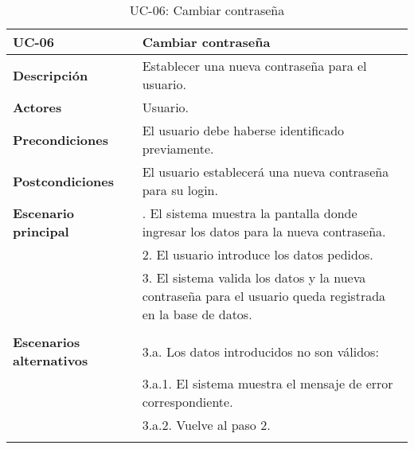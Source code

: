 \begin{table}[H]
  \begin{center}
    \begin{tabularx}{16.4cm}{|l|X|}
      \hline
      \textbf{UC-06} & \textbf{Cambiar contraseña}\\
      \hline
      \textbf{Descripción} & Establecer una nueva contraseña para el usuario.\\
      \hline
      \textbf{Actores} & Usuario.\\
      \hline
      \textbf{Precondiciones} & El usuario debe haberse identificado previamente.\\
      \hline
      \textbf{Postcondiciones} & El usuario establecerá una nueva contraseña para su login.\\
      \hline
      \textbf{Escenario principal} & \smallskip 1. El sistema muestra la pantalla donde ingresar los datos para la nueva contraseña.\\
      & 2. El usuario introduce los datos pedidos.\\
      & 3. El sistema valida los datos y la nueva contraseña para el usuario queda registrada en la base de datos.\\
      & \\
      \hline
      \textbf{Escenarios alternativos} & \smallskip 3.a. Los datos introducidos no son válidos:\\
      & \hspace{0.3cm} 3.a.1. El sistema muestra el mensaje de error correspondiente.\\
      & \hspace{0.3cm} 3.a.2. Vuelve al paso 2.\\
      & \\
      \hline
    \end{tabularx}
    \caption{UC-06: Cambiar contraseña}
  \end{center}
\end{table}


